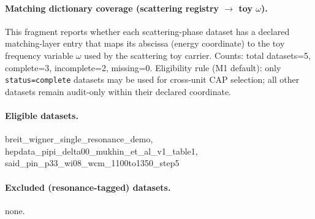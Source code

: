 \paragraph{Matching dictionary coverage (scattering registry $\to$ toy $\omega$).} \AuditTag This fragment reports whether each scattering-phase dataset has a declared matching-layer entry that maps its abscissa (energy coordinate) to the toy frequency variable $\omega$ used by the scattering toy carrier. Counts: total datasets=5, complete=3, incomplete=2, missing=0. Eligibility rule (M1 default): only \texttt{status=complete} datasets may be used for cross-unit CAP selection; all other datasets remain audit-only within their declared coordinate.
\paragraph{Eligible datasets.} \AuditTag breit\_wigner\_single\_resonance\_demo, hepdata\_pipi\_delta00\_mukhin\_et\_al\_v1\_table1, said\_pin\_p33\_wi08\_wcm\_1100to1350\_step5
\paragraph{Excluded (resonance-tagged) datasets.} \AuditTag none.